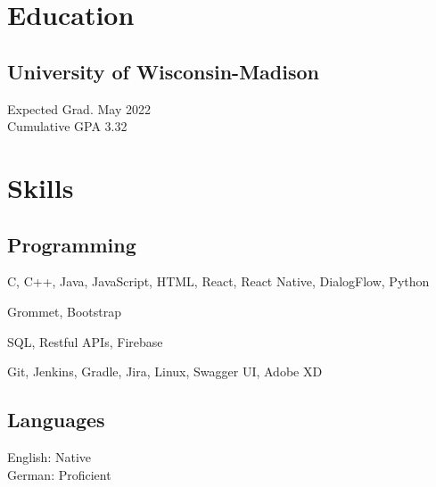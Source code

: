 \documentclass[]{hieudo-build}
\begin{document}
%
%
\begin{minipage}[t]{0.34\textwidth} 

\section{Education} 

\subsection{University of Wisconsin-Madison}
Expected Grad. May 2022 \\
Cumulative GPA 3.32\\
\sectionsep


\section{Skills}

\subsection{Programming}
\smallsectionsep

C, C++, Java, JavaScript, HTML, React, React Native, DialogFlow, Python\\ 
\smallsectionsep

Grommet, Bootstrap \\
\smallsectionsep

SQL, Restful APIs, Firebase \\
\smallsectionsep

Git, Jenkins, Gradle, Jira, Linux, Swagger UI, Adobe XD\\
\sectionsep

\subsection{Languages}
English: Native \\
German: Proficient \\
\sectionsep


\end{minipage}
\end{document}
